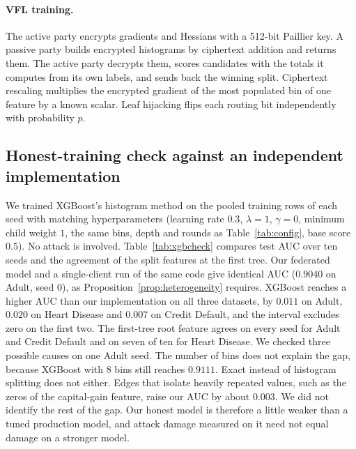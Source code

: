 \documentclass[11pt]{article}
\begin{document}
\paragraph{VFL training.} The active party encrypts gradients and Hessians with a 512-bit Paillier key. A passive party builds encrypted histograms by ciphertext addition and returns them. The active party decrypts them, scores candidates with the totals it computes from its own labels, and sends back the winning split. Ciphertext rescaling multiplies the encrypted gradient of the most populated bin of one feature by a known scalar. Leaf hijacking flips each routing bit independently with probability $p$.

\subsection{Honest-training check against an independent implementation}
\label{sec:xgbcheck}

We trained XGBoost's histogram method on the pooled training rows of each seed with matching hyperparameters (learning rate $0.3$, $\lambda=1$, $\gamma=0$, minimum child weight $1$, the same bins, depth and rounds as Table~\ref{tab:config}, base score $0.5$). No attack is involved. Table~\ref{tab:xgbcheck} compares test AUC over ten seeds and the agreement of the split features at the first tree. Our federated model and a single-client run of the same code give identical AUC ($0.9040$ on Adult, seed 0), as Proposition~\ref{prop:heterogeneity} requires. XGBoost reaches a higher AUC than our implementation on all three datasets, by $0.011$ on Adult, $0.020$ on Heart Disease and $0.007$ on Credit Default, and the interval excludes zero on the first two. The first-tree root feature agrees on every seed for Adult and Credit Default and on seven of ten for Heart Disease. We checked three possible causes on one Adult seed. The number of bins does not explain the gap, because XGBoost with 8 bins still reaches $0.9111$. Exact instead of histogram splitting does not either. Edges that isolate heavily repeated values, such as the zeros of the capital-gain feature, raise our AUC by about $0.003$. We did not identify the rest of the gap. Our honest model is therefore a little weaker than a tuned production model, and attack damage measured on it need not equal damage on a stronger model.
\end{document}
